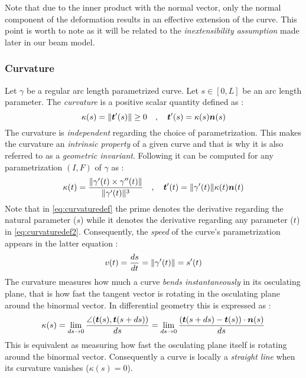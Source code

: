 Note that due to the inner product with the normal vector, only the normal component of the deformation results in an effective extension of the curve. This point is worth to note as it will be related to the \emph{inextensibility assumption} made later in our beam model.

\subsubsection{Curvature}
Let $\gamma$ be a regular arc length parametrized curve. Let $s \in [0,L]$ be an arc length parameter. The \emph{curvature} is a positive scalar quantity defined as :
\begin{equation}
	\kappa(s) = \lVert\boldsymbol{t}'(s)\rVert \ge 0 
	\quad,\quad
	\boldsymbol{t}'(s) = \kappa(s) \boldsymbol{n}(s)
\label{eq:curvaturedef}
\end{equation}
The curvature is \emph{independent} regarding the choice of parametrization. This makes the curvature an \emph{intrinsic property} of a given curve and that is why it is also referred to as a \emph{geometric invariant}. Following \cite[pp.203-204]{Gray2006} it can be computed for any parametrization $(I,F)$ of $\gamma$ as :
\begin{equation}
	\kappa(t) = \frac{\lVert\gamma'(t) \times \gamma''(t)\rVert}{\lVert\gamma'(t)\rVert^3}
	\quad,\quad
	\boldsymbol{t}'(t) = \lVert\gamma'(t)\rVert \kappa(t) \boldsymbol{n}(t)
\label{eq:curvaturedef2}
\end{equation}
Note that in \cref{eq:curvaturedef} the prime denotes the derivative regarding the natural parameter ($s$) while it denotes the derivative regarding any parameter ($t$) in \cref{eq:curvaturedef2}. Consequently, the \emph{speed} of the curve's parametrization appears in the latter equation :
\begin{equation}
	v(t) = \frac{ds}{dt} = \lVert\gamma'(t)\rVert = s'(t)
\end{equation}
The curvature measures how much a curve \emph{bends instantaneously} in its osculating plane, that is how fast the tangent vector is rotating in the osculating plane around the binormal vector. In differential geometry this is expressed as :
\begin{equation}
	\kappa(s)
	= \lim_{ds \to 0}\frac{\angle(\boldsymbol{t}(s),\boldsymbol{t}(s+ds))}{ds}
	= \lim_{ds \to 0}\frac{(\boldsymbol{t}(s+ds) - \boldsymbol{t}(s)) \cdot \boldsymbol{n}(s)}{ds}
\end{equation}
This is equivalent as measuring how fast the osculating plane itself is rotating around the binormal vector. Consequently a curve is locally a \emph{straight line} when its curvature vanishes ($\kappa(s)= 0$).

